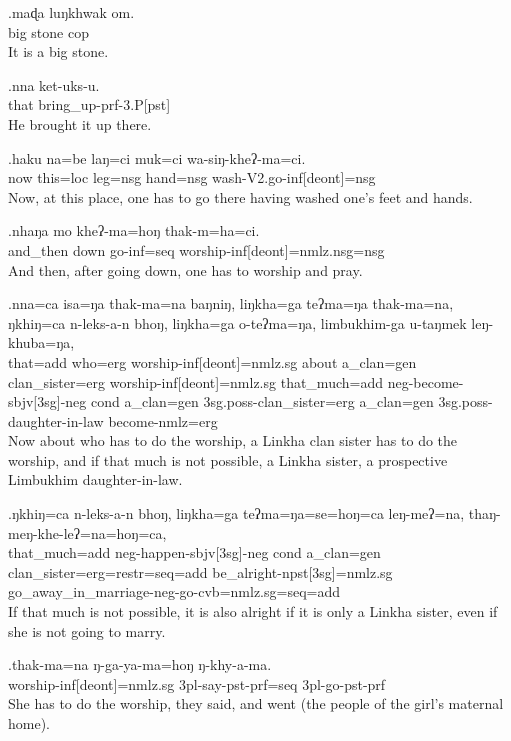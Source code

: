 \exg.maɖa luŋkhwak om.\\
big stone {\sc cop}\\
It is a big stone.

\exg.nna  ket-uks-u.\\
that bring\_up{\sc -prf-3.P[pst]}\\
He brought it up there.

\exg.haku  na=be  laŋ=ci  muk=ci wa-siŋ-kheʔ-ma=ci.\\
now this{\sc =loc} leg{\sc =nsg} hand{\sc =nsg} wash{\sc -V2.go-inf[deont]=nsg}\\
Now, at this place, one has to go there having washed  one's feet and hands. %

\exg.nhaŋa mo kheʔ-ma=hoŋ  thak-m=ha=ci.\\
and\_then down go{\sc -inf=seq}  worship{\sc -inf[deont]=nmlz.nsg=nsg}\\
And then, after going down, one has to worship and pray.

\exg.nna=ca isa=ŋa thak-ma=na   baŋniŋ, liŋkha=ga  teʔma=ŋa  thak-ma=na, ŋkhiŋ=ca  n-leks-a-n   bhoŋ, liŋkha=ga  o-teʔma=ŋa, limbukhim-ga  u-taŋmek  leŋ-khuba=ŋa,\\
that{\sc =add} who{\sc =erg} worship{\sc -inf[deont]=nmlz.sg} about  a\_clan{\sc =gen} clan\_sister{\sc =erg} worship{\sc -inf[deont]=nmlz.sg} that\_much{\sc =add} {\sc neg-}become{\sc -sbjv[3sg]-neg} {\sc cond} a\_clan{\sc =gen} {\sc 3sg.poss-}clan\_sister{\sc =erg} a\_clan{\sc =gen} {\sc 3sg.poss-}daughter-in-law become{\sc -nmlz=erg}\\
Now about who has to do the worship, a Linkha clan sister has to do the worship, and if that much is not possible, a Linkha sister, a prospective Limbukhim daughter-in-law.

\exg.ŋkhiŋ=ca  n-leks-a-n   bhoŋ, liŋkha=ga  teʔma=ŋa=se=hoŋ=ca    leŋ-meʔ=na, thaŋ-meŋ-khe-leʔ=na=hoŋ=ca,      \\
that\_much{\sc =add} {\sc neg-}happen{\sc -sbjv[3sg]-neg} {\sc cond} a\_clan{\sc =gen} clan\_sister{\sc =erg=restr=seq=add} be\_alright{\sc -npst[3sg]=nmlz.sg} go\_away\_in\_marriage-{\sc neg-}go{\sc -cvb=nmlz.sg=seq=add}\\
If that much is not possible, it is also alright if it is only a Linkha sister, even if she is not going to marry.

\exg.thak-ma=na   ŋ-ga-ya-ma=hoŋ   ŋ-khy-a-ma.\\
worship{\sc -inf[deont]=nmlz.sg} {\sc 3pl-}say{\sc -pst-prf=seq}  {\sc 3pl-}go{\sc -pst-prf}\\
She has to do the worship, they said, and went (the people of the girl's maternal home).

